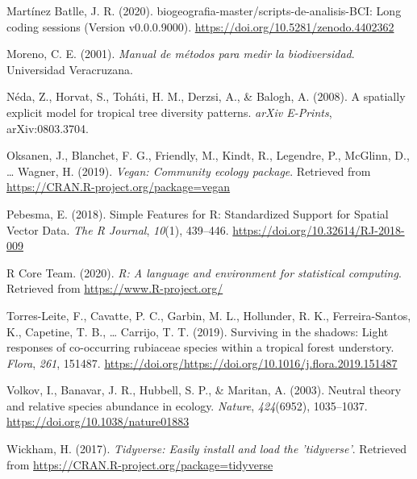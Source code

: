 \documentclass[11pt,]{article}
\begin{document}
\hypertarget{ref-jose_ramon_martinez_batlle_2020_4402362}{}
Martínez Batlle, J. R. (2020).
biogeografia-master/scripts-de-analisis-BCI: Long coding sessions
(Version v0.0.0.9000). \url{https://doi.org/10.5281/zenodo.4402362}

\hypertarget{ref-moreno2001manual}{}
Moreno, C. E. (2001). \emph{Manual de métodos para medir la
biodiversidad}. Universidad Veracruzana.

\hypertarget{ref-2008arXiv0803.3704N}{}
Néda, Z., Horvat, S., Toháti, H. M., Derzsi, A., \& Balogh, A. (2008). A
spatially explicit model for tropical tree diversity patterns.
\emph{arXiv E-Prints}, arXiv:0803.3704.

\hypertarget{ref-cita_vegan}{}
Oksanen, J., Blanchet, F. G., Friendly, M., Kindt, R., Legendre, P.,
McGlinn, D., \ldots{} Wagner, H. (2019). \emph{Vegan: Community ecology
package}. Retrieved from \url{https://CRAN.R-project.org/package=vegan}

\hypertarget{ref-cita_sf}{}
Pebesma, E. (2018). Simple Features for R: Standardized Support for
Spatial Vector Data. \emph{The R Journal}, \emph{10}(1), 439--446.
\url{https://doi.org/10.32614/RJ-2018-009}

\hypertarget{ref-cita_r}{}
R Core Team. (2020). \emph{R: A language and environment for statistical
computing}. Retrieved from \url{https://www.R-project.org/}

\hypertarget{ref-TORRESLEITE2019151487}{}
Torres-Leite, F., Cavatte, P. C., Garbin, M. L., Hollunder, R. K.,
Ferreira-Santos, K., Capetine, T. B., \ldots{} Carrijo, T. T. (2019).
Surviving in the shadows: Light responses of co-occurring rubiaceae
species within a tropical forest understory. \emph{Flora}, \emph{261},
151487.
\url{https://doi.org/https://doi.org/10.1016/j.flora.2019.151487}

\hypertarget{ref-Volkov_2003}{}
Volkov, I., Banavar, J. R., Hubbell, S. P., \& Maritan, A. (2003).
Neutral theory and relative species abundance in ecology. \emph{Nature},
\emph{424}(6952), 1035--1037. \url{https://doi.org/10.1038/nature01883}

\hypertarget{ref-cita_tidyverse}{}
Wickham, H. (2017). \emph{Tidyverse: Easily install and load the
'tidyverse'}. Retrieved from
\url{https://CRAN.R-project.org/package=tidyverse}




\newpage
\singlespacing 
\end{document}
